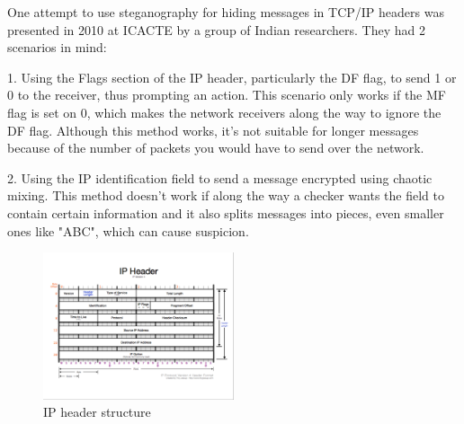 
One attempt to use steganography for hiding messages in TCP/IP headers was presented in 2010 at ICACTE by a group of Indian researchers.  They had 2 scenarios in mind:

1. Using the Flags section of the IP header, particularly the DF flag, to send 1 or 0 to the receiver, thus prompting an action. This scenario only works if the MF flag is set on 0, which makes the network receivers along the way to ignore the DF flag.  Although this method works, it's not suitable for longer messages because of the number of packets you would have to send over the network.

2. Using the IP identification field to send a message encrypted using chaotic mixing. This method doesn't work if along the way a checker wants the field to contain certain information and it also splits messages into pieces, even smaller ones like "ABC", which can cause suspicion. 

\begin{figure}
  \centering
  \includegraphics[width=0.5\textwidth]{img/IPHeader}
  \caption{IP header structure}
  \label{fig:related}
\end{figure}
